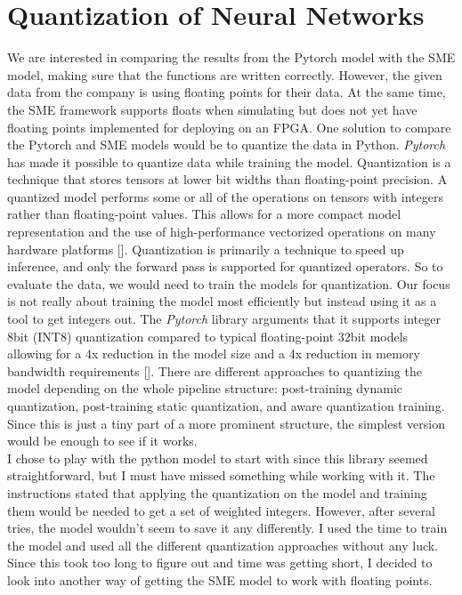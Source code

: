 \section{Quantization of Neural Networks}
\label{sub:quantization}
We are interested in comparing the results from the Pytorch model with the SME model, making sure that the functions are written correctly. However, the given data from the company is using floating points for their data. At the same time, the SME framework supports floats when simulating but does not yet have floating points implemented for deploying on an FPGA. One solution to compare the Pytorch and SME models would be to quantize the data in Python. \emph{Pytorch} has made it possible to quantize data while training the model. Quantization is a technique that stores tensors at lower bit widths than floating-point precision. A quantized model performs some or all of the operations on tensors with integers rather than floating-point values. This allows for a more compact model representation and the use of high-performance vectorized operations on many hardware platforms [\cite{quantization_pytorch}]. Quantization is primarily a technique to speed up inference, and only the forward pass is supported for quantized operators.
So to evaluate the data, we would need to train the models for quantization. Our focus is not really about training the model most efficiently but instead using it as a tool to get integers out.
The \emph{Pytorch} library arguments that it supports integer 8bit (INT8) quantization compared to typical floating-point 32bit models allowing for a 4x reduction in the model size and a 4x reduction in memory bandwidth requirements [\cite{quantization_pytorch}]. There are different approaches to quantizing the model depending on the whole pipeline structure: post-training dynamic quantization, post-training static quantization, and aware quantization training. Since this is just a tiny part of a more prominent structure, the simplest version would be enough to see if it works. \\

I chose to play with the python model to start with since this library seemed straightforward, but I must have missed something while working with it.
The instructions stated that applying the quantization on the model and training them would be needed to get a set of weighted integers. However, after several tries, the model wouldn't seem to save it any differently. I used the time to train the model and used all the different quantization approaches without any luck. Since this took too long to figure out and time was getting short, I decided to look into another way of getting the SME model to work with floating points. 


